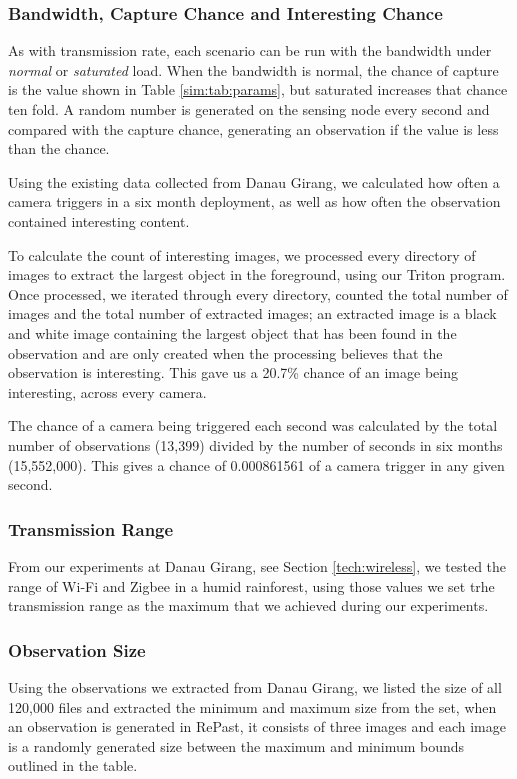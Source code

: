 
	\subsubsection{Bandwidth, Capture Chance and Interesting Chance}
	As with transmission rate, each scenario can be run with the bandwidth under \textit{normal} or \textit{saturated} load. When the bandwidth is normal, the chance of capture is the value shown in Table \ref{sim:tab:params}, but saturated increases that chance ten fold. A random number is generated on the sensing node every second and compared with the capture chance, generating an observation if the value is less than the chance. 

	Using the existing data collected from Danau Girang, we calculated how often a camera triggers in a six month deployment, as well as how often the observation contained interesting content. 
	
	To calculate the count of interesting images, we processed every directory of images to extract the largest object in the foreground, using our Triton program. Once processed, we iterated through every directory, counted the total number of images and the total number of extracted images; an extracted image is a black and white image containing the largest object that has been found in the observation and are only created when the processing believes that the observation is interesting. This gave us a 20.7\% chance of an image being interesting, across every camera.
	
	The chance of a camera being triggered each second was calculated by the total number of observations (13,399) divided by the number of seconds in six months (15,552,000). This gives a chance of 0.000861561 of a camera trigger in any given second.

	\subsubsection{Transmission Range}
	From our experiments at Danau Girang, see Section \ref{tech:wireless}, we tested the range of Wi-Fi and Zigbee in a humid rainforest, using those values we set trhe transmission range as the maximum that we achieved during our experiments.

	\subsubsection{Observation Size}
	Using the observations we extracted from Danau Girang, we listed the size of all 120,000 files and extracted the minimum and maximum size from the set, when an observation is generated in RePast, it consists of three images and each image is a randomly generated size between the maximum and minimum bounds outlined in the table.

